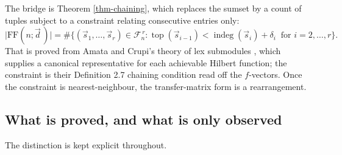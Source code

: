 \documentclass[11pt, a4paper, abstract=yes]{scrartcl}
\theoremstyle{definition}
\theoremstyle{remark}
\theoremstyle{plain}
\newcommand{\indeg}{\operatorname{indeg}}
\newcommand{\tp}{\operatorname{top}}
\begin{document}
The bridge is Theorem \ref{thm-chaining}, which replaces the sumset by a count of tuples subject to a
constraint relating consecutive entries only:
\begin{equation}\label{eq:auto-5}
  \lvert\mathrm{FF}(n;\vec d\,)\rvert=\#\bigl\lbrace(\vec s_1,\dots,\vec s_r)\in\mathcal F_n^{\,r}:
   \tp(\vec s_{i-1})<\indeg(\vec s_i)+\delta_i\ \text{ for } i=2,\dots,r\bigr\rbrace .
\end{equation}
That is proved from Amata and Crupi's theory of lex submodules \autocite{AmataCrupi2020,AmataCrupi2020KK}, which supplies a canonical
representative for each achievable Hilbert function; the constraint is their Definition 2.7 chaining
condition read off the \(f\)-vectors. Once the constraint is nearest-neighbour, the transfer-matrix
form is a rearrangement.
\subsection{What is proved, and what is only observed}
\label{sec:orgedadeb8}

The distinction is kept explicit throughout.
\end{document}
